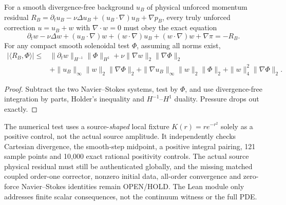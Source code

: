\begin{proposition}
For a smooth divergence-free background $u_B$ of physical unforced
momentum residual
$R_B=\partial_tu_B-\nu\Delta u_B+
(u_B\cdot\nabla)u_B+\nabla p_B$,
every truly unforced correction $u=u_B+w$ with $\nabla\cdot w=0$
must obey the exact equation
\[
\partial_tw-\nu\Delta w
+(u_B\cdot\nabla)w+(w\cdot\nabla)u_B
+(w\cdot\nabla)w+\nabla\pi=-R_B.
\]
For any compact smooth solenoidal test $\Phi$, assuming all norms exist,
\begin{align*}
|\langle R_B,\Phi\rangle|
\le{}&
\|\partial_tw\|_{H^{-1}}\|\Phi\|_{H^1}
+\nu\|\nabla w\|_2\|\nabla\Phi\|_2\\
&+\|u_B\|_\infty\|w\|_2\|\nabla\Phi\|_2
+\|\nabla u_B\|_\infty\|w\|_2\|\Phi\|_2
+\|w\|_4^2\|\nabla\Phi\|_2.
\end{align*}
\end{proposition}
\begin{proof}
Subtract the two Navier--Stokes systems, test by $\Phi$,
and use divergence-free integration by parts, Holder's inequality
and $H^{-1}$--$H^1$ duality. Pressure drops out exactly.
\end{proof}
The numerical test uses a source-\emph{shaped} local fixture
$K(r)=re^{-r^2}$ solely as a positive control, not the
actual source amplitude. It independently checks Cartesian
divergence, the smooth-step midpoint, a positive integral pairing,
121 sample points and 10,000 exact rational positivity controls.
The actual source physical residual must still be authenticated
globally, and the missing matched coupled order-one corrector,
nonzero initial data, all-order convergence and zero-force
Navier--Stokes identities remain OPEN/HOLD.
The Lean module only addresses finite scalar consequences, not
the continuum witness or the full PDE.